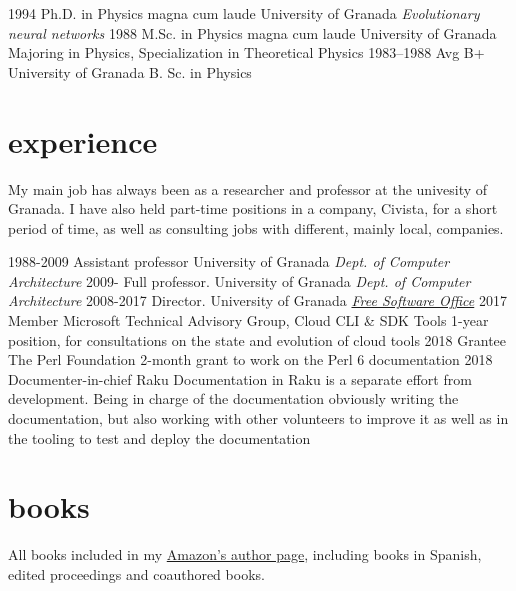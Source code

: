 \documentclass[]{friggeri-jj-cv}
\begin{document}
\begin{entrylist}
  \entry
    {1994}
    {Ph.D. {\normalfont in Physics} magna cum laude}
    {University of Granada}
    {\emph{Evolutionary neural networks}}
  \entry
    {1988}
    {M.Sc. {\normalfont in Physics} magna cum laude}
    {University of Granada}
    {Majoring in Physics, Specialization in Theoretical Physics}
  \entry
    {1983–1988}
    {Avg B+}
    {University of Granada}
    {B. Sc. in Physics}
\end{entrylist}

\section{experience}

My main job has always been as a researcher and professor at the
univesity of Granada. I have also held part-time positions in a
company, Civista, for a short period of time, as well as consulting
jobs with different, mainly local, companies.

\begin{entrylist}
  \entry
    {1988-2009}
    {Assistant professor}
    {University of Granada}
    {\emph{Dept. of Computer Architecture}}
  \entry
    {2009-}
    {Full professor.}
    {University of Granada}
    {\emph{Dept. of Computer Architecture}}
    \entry
    {2008-2017}
    {Director.}
    {University of Granada}
    {\href{http://osl.ugr.es}{\emph{Free Software Office}}}
    \entry
    {2017}
    {Member}
    {Microsoft Technical Advisory Group, Cloud CLI \& SDK Tools}
    {1-year position, for consultations on the state and evolution of
      cloud tools}
    \entry
    {2018}
    {Grantee}
    {The Perl Foundation}
    {2-month grant to work on the Perl 6 documentation}
    \entry
    {2018}
    {Documenter-in-chief}
    {Raku}
    {Documentation in Raku is a separate effort from
      development. Being in charge of the documentation obviously
      writing the documentation, but also working with other
      volunteers to improve it as well as in the tooling to test and
      deploy the documentation}
\end{entrylist}

\newpage

\section{books}

All books included in my
\href{https://amazon.com/author/jjmerelo}{Amazon's author page},
including books in Spanish, edited proceedings and coauthored books.
\end{document}
